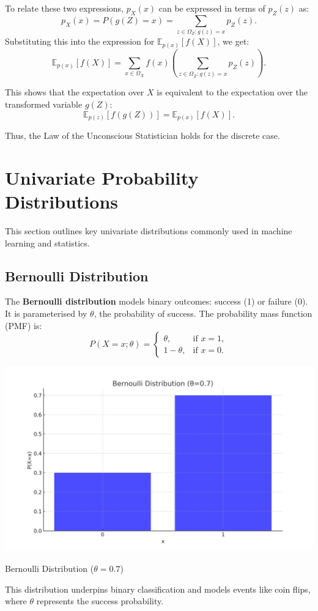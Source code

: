 To relate these two expressions, $p_X(x)$ can be expressed in terms of $p_Z(z)$ as:
\[
    p_X(x) = P(g(Z) = x) = \sum_{z \in \Omega_Z : g(z) = x} p_Z(z).
\]
Substituting this into the expression for $\mathbb{E}_{p(x)}[f(X)]$, we get:
\[
    \mathbb{E}_{p(x)}[f(X)] = \sum_{x \in \Omega_X} f(x) \left( \sum_{z \in \Omega_Z : g(z) = x} p_Z(z) \right).
\]

This shows that the expectation over $X$ is equivalent to the expectation over the transformed variable $g(Z)$:
\[
    \mathbb{E}_{p(z)}[f(g(Z))] = \mathbb{E}_{p(x)}[f(X)].
\]

Thus, the Law of the Unconscious Statistician holds for the discrete case.



\section{Univariate Probability Distributions}

This section outlines key univariate distributions commonly used in machine learning and statistics.

\subsection{Bernoulli Distribution}

The \textbf{Bernoulli distribution} models binary outcomes: success (1) or failure (0). It is parameterised by $\theta$, the probability of success. The probability mass function (PMF) is:
\[
    P(X = x; \theta) =
    \begin{cases}
        \theta,     & \text{if } x = 1, \\
        1 - \theta, & \text{if } x = 0.
    \end{cases}
\]
\begin{marginfigure}
    \includegraphics[width=\linewidth]{img/bernoulli_distribution.png}
    \caption{Bernoulli Distribution ($\theta=0.7$)}
    \label{fig:bernoulli}
\end{marginfigure}
This distribution underpins binary classification and models events like coin flips, where $\theta$ represents the success probability.

